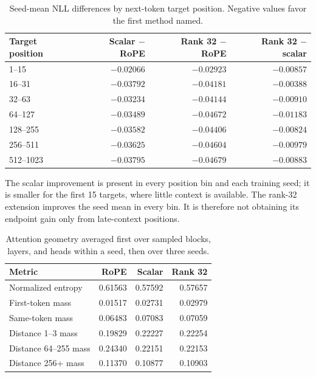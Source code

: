 \documentclass{article}
\begin{document}
\begin{table}[t]
\centering
\caption{Seed-mean NLL differences by next-token target position. Negative
values favor the first method named.}
\label{tab:positionloss}
\begin{tabular}{lrrr}
\toprule
Target position & Scalar $-$ RoPE & Rank 32 $-$ RoPE & Rank 32 $-$ scalar \\
\midrule
1--15    & $-0.02066$ & $-0.02923$ & $-0.00857$ \\
16--31   & $-0.03792$ & $-0.04181$ & $-0.00388$ \\
32--63   & $-0.03234$ & $-0.04144$ & $-0.00910$ \\
64--127  & $-0.03489$ & $-0.04672$ & $-0.01183$ \\
128--255 & $-0.03582$ & $-0.04406$ & $-0.00824$ \\
256--511 & $-0.03625$ & $-0.04604$ & $-0.00979$ \\
512--1023& $-0.03795$ & $-0.04679$ & $-0.00883$ \\
\bottomrule
\end{tabular}
\end{table}

The scalar improvement is present in every position bin and each training
seed; it is smaller for the first 15 targets, where little context is
available. The rank-32 extension improves the seed mean in every bin. It is
therefore not obtaining its endpoint gain only from late-context positions.

\begin{table}[t]
\centering
\caption{Attention geometry averaged first over sampled blocks, layers, and
heads within a seed, then over three seeds.}
\label{tab:attentiongeometry}
\begin{tabular}{lrrr}
\toprule
Metric & RoPE & Scalar & Rank 32 \\
\midrule
Normalized entropy & 0.61563 & 0.57592 & 0.57657 \\
First-token mass & 0.01517 & 0.02731 & 0.02979 \\
Same-token mass & 0.06483 & 0.07083 & 0.07059 \\
Distance 1--3 mass & 0.19829 & 0.22227 & 0.22254 \\
Distance 64--255 mass & 0.24340 & 0.22151 & 0.22153 \\
Distance 256+ mass & 0.11370 & 0.10877 & 0.10903 \\
\bottomrule
\end{tabular}
\end{table}
\end{document}
